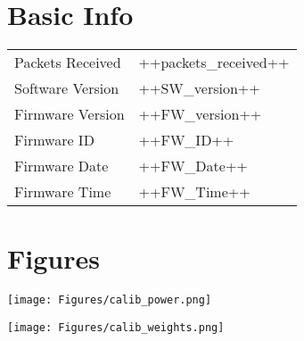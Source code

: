 
\section{Basic Info}

\begin{tabular}{p{5cm}p{5cm}}
    Packets Received              & ++packets_received++                                         \\
    Software Version              & ++SW_version++                                               \\
    Firmware Version              & ++FW_version++                                               \\
    Firmware ID                   & ++FW_ID++                                                    \\
    Firmware Date                 & ++FW_Date++                                                  \\
    Firmware Time                 & ++FW_Time++                                                  \\
\end{tabular}


\section{Figures}

\texttt{[image: Figures/calib\_power.png]}


\texttt{[image: Figures/calib\_weights.png]}
